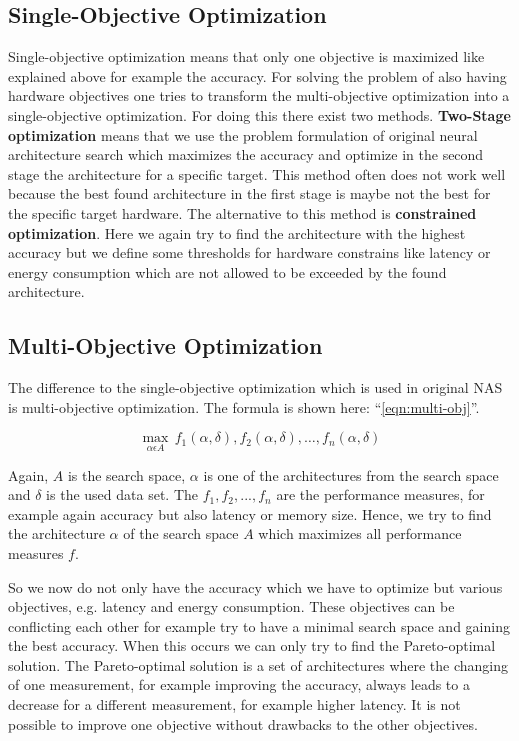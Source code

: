 \documentclass[conference]{IEEEtran}
\begin{document}
\subsection{Single-Objective Optimization}

Single-objective optimization means that only one objective is maximized like explained above for example the accuracy. For solving the problem of also having hardware objectives one tries to transform the multi-objective optimization into a single-objective optimization. For doing this there exist two methods. \textbf{Two-Stage optimization} means that we use the problem formulation of original neural architecture search which maximizes the accuracy and optimize in the second stage the architecture for a specific target. This method often does not work well because the best found architecture in the first stage is maybe not the best for the specific target hardware. The alternative to this method is \textbf{constrained optimization}. Here we again try to find the architecture with the highest accuracy but we define some thresholds for hardware constrains like latency or energy consumption which are not allowed to be exceeded by the found architecture. 

\subsection{Multi-Objective Optimization}

The difference to the single-objective optimization which is used in original NAS is multi-objective optimization. The formula is shown here: ``\eqref{eqn:multi-obj}''.
 
\begin{equation}
\label{eqn:multi-obj}
\max_{\alpha\epsilon A}\,f_{1}(\alpha, \delta),f_{2}(\alpha, \delta),\ldots ,f_{n}(\alpha, \delta)
\end{equation}     

Again, $A$ is the search space, $\alpha$ is one of the architectures from the search space and $\delta$ is the used data set. The $f_{1}, f_{2}, ..., f_{n}$ are the performance measures, for example again accuracy but also latency or memory size. Hence, we try to find the architecture $\alpha$ of the search space $A$ which maximizes all performance measures $f$. 

So we now do not only have the accuracy which we have to optimize but various objectives, e.g. latency and energy consumption. These objectives can be conflicting each other for example try to have a minimal search space and gaining the best accuracy. When this occurs we can only try to find the Pareto-optimal solution. The Pareto-optimal solution is a set of architectures where the changing of one measurement, for example improving the accuracy, always leads to a decrease for a different measurement, for example higher latency. It is not possible to improve one objective without drawbacks to the other objectives.
\end{document}
